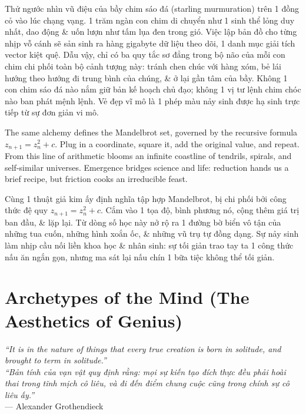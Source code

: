 \documentclass[11pt]{article}
\begin{document}
Thử ngước nhìn vũ điệu của bầy chim sáo đá (starling murmuration) trên 1 đồng cỏ vào lúc chạng vạng. 1 trăm ngàn con chim di chuyển như 1 sinh thể lỏng duy nhất, dao động \& uốn lượn như tấm lụa đen trong gió. Việc lập bản đồ cho từng nhịp vỗ cánh sẽ sản sinh ra hàng gigabyte dữ liệu theo dõi, 1 danh mục giải tích vector kiệt quệ. Dẫu vậy, chỉ có ba quy tắc sơ đẳng trong bộ não của mỗi con chim chi phối toàn bộ cảnh tượng này: tránh chen chúc với hàng xóm, bẻ lái hướng theo hướng đi trung bình của chúng, \& ở lại gần tâm của bầy. Không 1 con chim sáo đá nào nắm giữ bản kế hoạch chủ đạo; không 1 vị tư lệnh chim chóc nào ban phát mệnh lệnh. Vẻ đẹp vĩ mô là 1 phép màu nảy sinh được hạ sinh trực tiếp từ sự đơn giản vi mô.

The same alchemy defines the Mandelbrot set, governed by the recursive formula $z_{n+1} = z_n^2 + c$. Plug in a coordinate, square it, add the original value, and repeat. From this line of arithmetic blooms an infinite coastline of tendrils, spirals, and self-similar universes. Emergence bridges science and life: reduction hands us a brief recipe, but friction cooks an irreducible feast.

Cùng 1 thuật giả kim ấy định nghĩa tập hợp Mandelbrot, bị chi phối bởi công thức đệ quy $z_{n+1} = z_n^2 + c$. Cắm vào 1 tọa độ, bình phương nó, cộng thêm giá trị ban đầu, \& lặp lại. Từ dòng số học này nở rộ ra 1 đường bờ biển vô tận của những tua cuốn, những hình xoắn ốc, \& những vũ trụ tự đồng dạng. Sự nảy sinh làm nhịp cầu nối liền khoa học \& nhân sinh: sự tối giản trao tay ta 1 công thức nấu ăn ngắn gọn, nhưng ma sát lại nấu chín 1 bữa tiệc không thể tối giản.


\part{Archetypes of the Mind (The Aesthetics of Genius)}

\vspace{0.5cm}
\begin{flushright}
    \begin{minipage}{0.65\textwidth}
        \textit{``It is in the nature of things that every true creation is born in solitude, and brought to term in solitude.''} \\
        \textit{``Bản tính của vạn vật quy định rằng: mọi sự kiến tạo đích thực đều phải hoài thai trong tĩnh mịch cô liêu, và đi đến điểm chung cuộc cũng trong chính sự cô liêu ấy.''} \\
        \vspace{1mm}
        \raggedleft \textsf{--- Alexander Grothendieck}
    \end{minipage}
\end{flushright}
\vspace{1cm}
\end{document}
